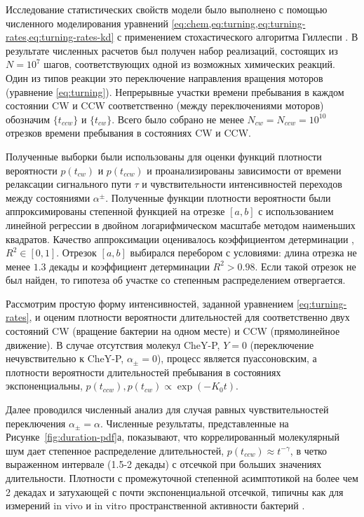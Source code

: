 Исследование статистических свойств модели было выполнено с помощью численного моделирования уравнений \cref{eq:chem,eq:turning,eq:turning-rates,eq:turning-rates-kd} с применением стохастического алгоритма Гиллеспи \cite{gillespie_stochastic_2007}. В результате численных расчетов был получен набор реализаций, состоящих из $N=10^7$ шагов, соответствующих одной из возможных химических реакций. Один из типов реакции это переключение направления вращения моторов (уравнение \cref{eq:turning}). Непрерывные участки времени пребывания в каждом состоянии CW и CCW соответственно (между переключениями моторов) обозначим $\{t_{ccw}\}$ и $\{t_{cw}\}$. Всего было собрано не менее $N_{cw} = N_{ccw} = 10^{10}$ отрезков времени пребывания в состояниях CW и CCW.

Полученные выборки были использованы для оценки функций плотности вероятности $p(t_{cw})$ и $p(t_{ccw})$ и проанализированы зависимости от времени релаксации сигнального пути $\tau$ и чувствительности интенсивностей переходов между состояниями $\alpha^{\pm}$. Полученные функции плотности вероятности были аппроксимированы степенной функцией на отрезке $[a, b]$ с использованием линейной регрессии в двойном логарифмическом масштабе методом наименьших квадратов. Качество аппроксимации оценивалось коэффициентом детерминации \cite{magnus_2021}, $R^2 \in [0, 1]$. Отрезок $[a, b]$ выбирался перебором с условиями: длина отрезка не менее $1.3$ декады и коэффициент детерминации $R^2 > 0.98$. Если такой отрезок не был найден, то гипотеза об участке со степенным распределением отвергается. 

Рассмотрим простую форму интенсивностей, заданной уравнением \cref{eq:turning-rates}, и оценим плотности вероятности длительностей для соответственно двух состояний CW (вращение бактерии на одном месте) и CCW (прямолинейное движение). В случае отсутствия молекул CheY-P, $Y=0$ (переключение нечувствительно к CheY-P, $\alpha_{\pm}=0$), процесс является пуассоновским, а плотности вероятности длительностей пребывания в состояниях экспоненциальны, $p(t_{ccw}), p(t_{cw}) \propto \exp(-K_0 t)$.

Далее проводился численный анализ для случая равных чувствительностей переключения $\alpha_\pm = \alpha$. Численные результаты, представленные на Рисунке~\cref{fig:duration-pdf}а, показывают, что коррелированный молекулярный шум дает степенное распределение длительностей, $p(t_{ccw}) \approx t^{-\gamma}$, в четко выраженном интервале (1.5-2 декады) с отсечкой при больших значениях длительности. Плотности с промежуточной степенной асимптотикой на более чем 2 декадах и затухающей с почти экспоненциальной отсечкой, типичны как для измерений in vivo и in vitro пространственной активности бактерий \cite{korobkova_molecular_2004,harris_generalized_2012}.

